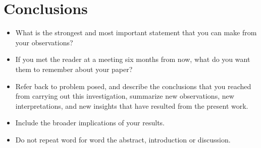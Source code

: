 \chapter{Conclusions}
\begin{itemize}
  \item What is the strongest and most important statement that you can make from your observations?
  \item If you met the reader at a meeting six months from now, what do you want them to remember about your paper?
  \item Refer back to problem posed, and describe the conclusions that you reached from carrying out this investigation, summarize new observations, new interpretations, and new insights that have resulted from the present work.
  \item Include the broader implications of your results.
  \item Do not repeat word for word the abstract, introduction or discussion.
\end{itemize}